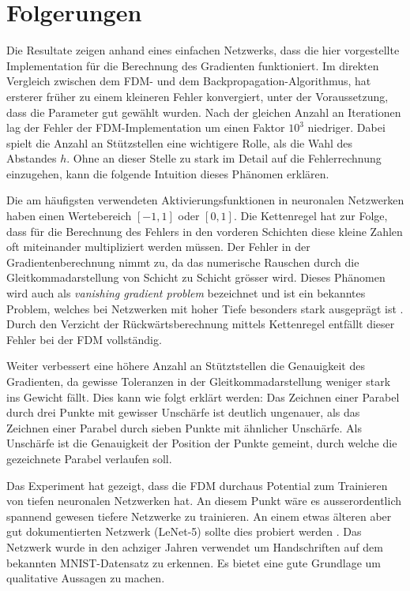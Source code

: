 %
%
%
\section{Folgerungen
\label{ableitung:section:folgerungen}}
Die Resultate zeigen anhand eines einfachen Netzwerks, dass die hier
vorgestellte Implementation für die Berechnung des Gradienten funktioniert.
Im direkten Vergleich zwischen dem FDM- und dem
Backpropagation-Algorithmus, hat ersterer früher zu einem kleineren
Fehler konvergiert, unter der Voraussetzung,
dass die Parameter gut gewählt wurden.
Nach der gleichen Anzahl an Iterationen lag der Fehler der FDM-Implementation um einen Faktor $10^3$ niedriger.
Dabei spielt die Anzahl an Stützstellen eine wichtigere Rolle, als die Wahl des Abstandes $h$.
Ohne an dieser Stelle zu stark im Detail auf die Fehlerrechnung einzugehen, kann die folgende Intuition dieses Phänomen erklären.

Die am häufigsten verwendeten Aktivierungsfunktionen in neuronalen
Netzwerken haben einen Wertebereich $[-1, 1]$ oder $[0, 1]$.
Die Kettenregel hat zur Folge, dass für die Berechnung des Fehlers
in den vorderen Schichten diese kleine Zahlen oft miteinander
multipliziert werden müssen.
%
Der Fehler in der Gradientenberechnung nimmt zu, da das numerische
Rauschen durch die Gleitkommadarstellung von Schicht zu Schicht
grösser wird.
Dieses Phänomen wird auch als {\em vanishing gradient problem}
bezeichnet und ist ein bekanntes Problem, welches bei Netzwerken
mit hoher Tiefe besonders stark ausgeprägt ist \cite{ableitung:vanish-gradient}.
%
Durch den Verzicht der Rückwärtsberechnung mittels Kettenregel entfällt
dieser Fehler bei der FDM vollständig. 

Weiter verbessert eine höhere Anzahl an Stütztstellen die Genauigkeit des
Gradienten, da gewisse Toleranzen in der Gleitkommadarstellung weniger
stark ins Gewicht fällt.
Dies kann wie folgt erklärt werden: Das Zeichnen einer Parabel durch drei Punkte mit gewisser Unschärfe ist deutlich ungenauer, als das Zeichnen einer Parabel durch sieben Punkte mit ähnlicher Unschärfe.
Als Unschärfe ist die Genauigkeit der Position der Punkte gemeint, durch welche die gezeichnete Parabel verlaufen soll.

Das Experiment hat gezeigt, dass die FDM durchaus Potential zum Trainieren
von tiefen neuronalen Netzwerken hat.
An diesem Punkt wäre es ausserordentlich spannend gewesen tiefere Netzwerke zu trainieren.
An einem etwas älteren aber gut dokumentierten Netzwerk (LeNet-5)
sollte dies probiert werden \cite{ableitung:lenet}.
Das Netzwerk wurde in den achziger Jahren verwendet um Handschriften
auf dem bekannten MNIST-Datensatz zu erkennen.
%
Es bietet eine gute Grundlage um qualitative Aussagen zu machen.

